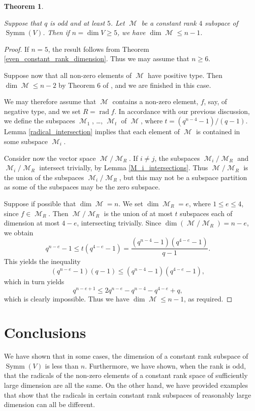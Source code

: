 \documentclass{amsart}
\DeclareMathOperator{\M}{\mathcal{M}}
\DeclareMathOperator{\rad}{rad}
\DeclareMathOperator{\Symm}{Symm}
\theoremstyle{plain}
\newtheorem{theorem}{Theorem}
\theoremstyle{definition}
\begin{document}
\begin{theorem} \label{constant_rank_4_dimension}
 
Suppose that $q$ is odd and at least $5$. Let $\M$ be a constant rank $4$ subspace of $\Symm(V)$. Then if $n=\dim V\geq 5$, we have $\dim \M\leq n-1$.
\end{theorem}

 \begin{proof}
If $n=5$, the result follows from Theorem \ref{even_constant_rank_dimension}. Thus we may assume that $n\geq 6$. 

Suppose now that all non-zero elements of $\M$ have positive type. Then $\dim \M\leq n-2$ by Theorem 6 of \cite{DGS}, and we are finished in this case.

We may therefore assume that $\M$ contains a non-zero element, $f$, say, of negative type, and we set $R=\rad f$. In accordance with our previous discussion, we define the subspaces $\M_1$, \dots, $\M_t$ of $\M$, where $t=(q^{n-4}-1)/(q-1)$. Lemma \ref{radical_intersection} implies that
each element of $\M$ is contained in some subspace $\M_i$.

Consider now the vector space $\M/\M_R$. If $i\neq j$, the subspaces $\M_i/\M_R$ and $\M_i/\M_R$ intersect trivially, by Lemma \ref{M_i_intersections}. Thus $\M/\M_R$ is the  union of the subspaces $\M_i/\M_R$, but this may not be a subspace partition as some of the subspaces may be the zero subspace. 

Suppose if possible that $\dim \M=n$. We set $\dim \M_R=e$, where $1\leq e\leq 4$, since $f\in \M_R$. Then $\M/\M_R$ is the union of at most
$t$ subspaces each of dimension at most $4-e$, intersecting trivially. Since $\dim (\M/\M_R)=n-e$, we obtain
\[
 q^{n-e}-1\leq t(q^{4-e}-1)=\frac{(q^{n-4}-1)(q^{4-e}-1)}{q-1}.
\]
This yields the inequality
\[
 (q^{n-e}-1)(q-1)\leq (q^{n-4}-1)(q^{4-e}-1),
\]
which in turn yields
\[
 q^{n-e+1}\leq 2q^{n-e}-q^{n-4}-q^{4-e}+q,
\]
which is clearly impossible. Thus we have $\dim \M\leq n-1$, as required.

 \end{proof}

\section{Conclusions}


\noindent We have shown that in some cases, the dimension of a constant rank subspace of $\Symm(V)$ is less than $n$. Furthermore, we have shown, when the rank is odd, that the radicals of the non-zero elements of a constant rank space of sufficiently large dimension are all the same. On the other hand, we have provided examples that show that the radicals in certain constant rank subspaces of reasonably large dimension can all be different.
\end{document}
